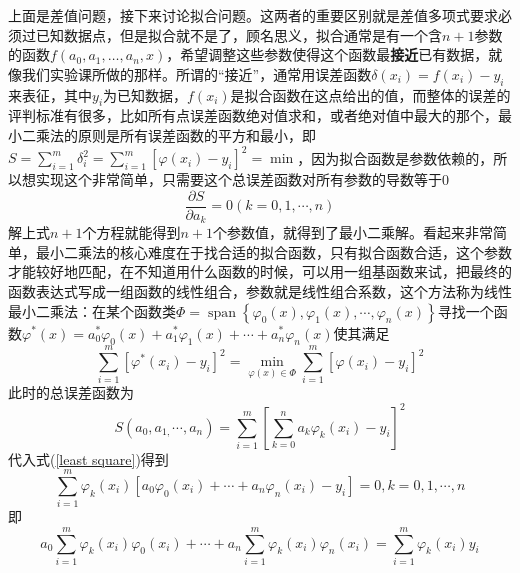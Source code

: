 \documentclass[12pt,a4paper,openany,twoside]{book}
\numberwithin{equation}{section}
\begin{document}
      上面是差值问题，接下来讨论拟合问题。这两者的重要区别就是差值多项式要求必须过已知数据点，但是拟合就不是了，顾名思义，拟合通常是有一个含$n+1$参数的函数$f(a_0,a_1,\dots,a_n,x)$，希望调整这些参数使得这个函数最\textbf{接近}已有数据，就像我们实验课所做的那样。所谓的“接近”，通常用误差函数$\delta(x_i)=f(x_i)-y_i$来表征，其中$y_i$为已知数据，$f(x_i)$是拟合函数在这点给出的值，而整体的误差的评判标准有很多，比如所有点误差函数绝对值求和，或者绝对值中最大的那个，最小二乘法的原则是所有误差函数的平方和最小，即$S=\sum_{i=1}^{m} \delta_{i}^{2}=\sum_{i=1}^{m}\left[\varphi\left(x_{i}\right)-y_{i}\right]^{2}=\min$，因为拟合函数是参数依赖的，所以想实现这个非常简单，只需要这个总误差函数对所有参数的导数等于0
      \begin{equation}
        \frac{\partial S}{\partial a_{k}}=0 (k=0,1, \cdots, n)
        \label{least square}
      \end{equation}
      解上式$n+1$个方程就能得到$n+1$个参数值，就得到了最小二乘解。看起来非常简单，最小二乘法的核心难度在于找合适的拟合函数，只有拟合函数合适，这个参数才能较好地匹配，在不知道用什么函数的时候，可以用一组基函数来试，把最终的函数表达式写成一组函数的线性组合，参数就是线性组合系数，这个方法称为线性最小二乘法：在某个函数类$\Phi=\operatorname{span}\left\{\varphi_{0}(x), \varphi_{1}(x), \cdots, \varphi_{n}(x)\right\}$寻找一个函数$\varphi^{*}(x)=a_{0}^{*} \varphi_{0}(x)+a_{1}^{*} \varphi_{1}(x)+\cdots+a_{n}^{*} \varphi_{n}(x)$使其满足
      \begin{equation}
        \sum_{i=1}^{m}\left[\varphi^{*}\left(x_{i}\right)-y_{i}\right]^{2}=\min _{\varphi(x) \in \Phi} \sum_{i=1}^{m}\left[\varphi\left(x_{i}\right)-y_{i}\right]^{2}
      \end{equation}
      此时的总误差函数为
      \begin{equation}
        S\left(a_{0}, a_{1,} \cdots, a_{n}\right)=\sum_{i=1}^{m}\left[\sum_{k=0}^{n} a_{k} \varphi_{k}\left(x_{i}\right)-y_{i}\right]^{2}
      \end{equation}
      代入式(\ref{least square})得到
      \begin{equation}
        \sum_{i=1}^{m} \varphi_{k}\left(x_{i}\right)\left[a_{0} \varphi_{0}\left(x_{i}\right)+\cdots+a_{n} \varphi_{n}\left(x_{i}\right)-y_{i}\right]=0, k=0,1, \cdots, n
      \end{equation}
      即
      \begin{equation}
        a_{0} \sum_{i=1}^{m} \varphi_{k}\left(x_{i}\right) \varphi_{0}\left(x_{i}\right)+\cdots+a_{n} \sum_{i=1}^{m} \varphi_{k}\left(x_{i}\right) \varphi_{n}\left(x_{i}\right)=\sum_{i=1}^{m} \varphi_{k}\left(x_{i}\right) y_{i}
      \end{equation}
\end{document}
